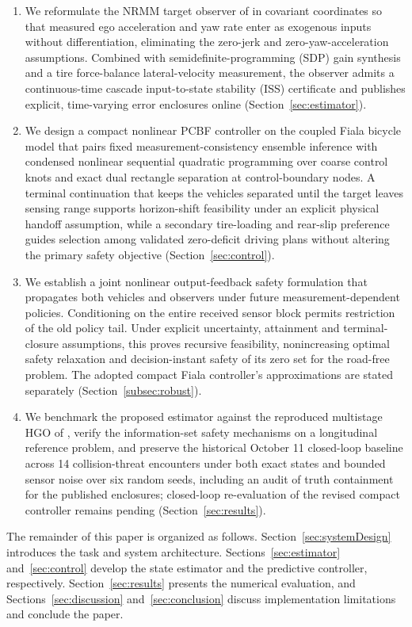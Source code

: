 \documentclass[journal]{IEEEtran}
\theoremstyle{definition}
\begin{document}
\begin{enumerate}
\item We reformulate the NRMM target observer of
\cite{SharmaAlaiRajamani2026} in covariant coordinates so that measured
ego acceleration and yaw rate enter as exogenous inputs without
differentiation, eliminating the zero-jerk and zero-yaw-acceleration
assumptions. Combined with semidefinite-programming (SDP) gain synthesis
and a tire force-balance lateral-velocity measurement, the observer
admits a continuous-time cascade input-to-state stability (ISS)
certificate and publishes explicit, time-varying error enclosures online
(Section~\ref{sec:estimator}).
\item We design a compact nonlinear PCBF controller on the coupled Fiala
bicycle model that pairs fixed measurement-consistency ensemble inference
with condensed nonlinear sequential quadratic programming over coarse
control knots and exact dual rectangle separation at control-boundary
nodes. A terminal continuation that keeps the vehicles separated until
the target leaves sensing range supports horizon-shift feasibility under an explicit
physical handoff assumption, while a secondary tire-loading and rear-slip
preference guides selection among validated zero-deficit driving plans
without altering the primary safety objective (Section~\ref{sec:control}).
\item We establish a joint nonlinear output-feedback safety formulation
that propagates both vehicles and observers under future
measurement-dependent policies. Conditioning on the entire received
sensor block permits restriction of the old policy tail. Under explicit
uncertainty, attainment and terminal-closure assumptions, this proves
recursive feasibility, nonincreasing optimal safety relaxation and
decision-instant safety of its zero set for the road-free problem.
The adopted compact Fiala controller's approximations are stated
separately (Section~\ref{subsec:robust}).
\item We benchmark the proposed estimator against the reproduced
multistage HGO of \cite{SharmaAlaiRajamani2026}, verify the
information-set safety mechanisms on a longitudinal reference problem,
and preserve the historical October 11 closed-loop baseline across 14
collision-threat encounters under both exact states and bounded sensor
noise over six random seeds, including an audit of truth containment for
the published enclosures; closed-loop re-evaluation of the revised
compact controller remains pending (Section~\ref{sec:results}).
\end{enumerate}
The remainder of this paper is organized as follows.
Section~\ref{sec:systemDesign} introduces the task and system architecture.
Sections~\ref{sec:estimator} and~\ref{sec:control} develop the state
estimator and the predictive controller, respectively. Section~\ref{sec:results} presents the
numerical evaluation, and Sections~\ref{sec:discussion}
and~\ref{sec:conclusion} discuss implementation limitations and conclude
the paper.
\end{document}

